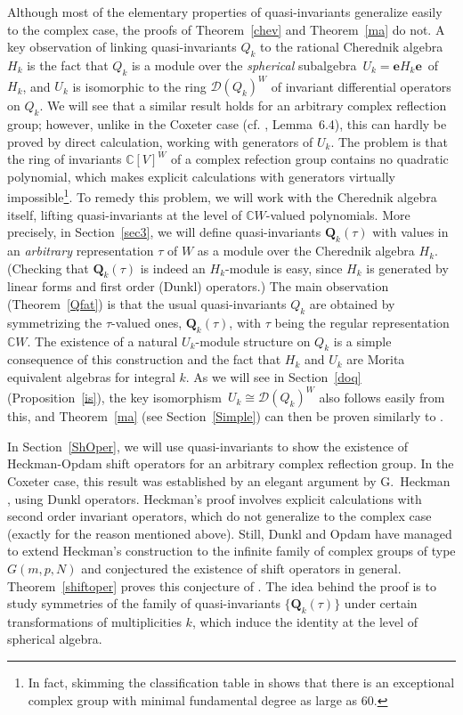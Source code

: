 \documentclass{amsart}
\theoremstyle{definition}
\theoremstyle{remark}
\numberwithin{equation}{section}
\begin{document}
Although most of the elementary properties of quasi-invariants generalize
easily to the complex case, the proofs of Theorem~\ref{chev} and Theorem~\ref{ma} do not.
A key observation of \cite{BEG} linking quasi-invariants $ Q_k $ to
the rational Cherednik algebra $ H_k $  is the fact
that $Q_k $ is a module over the {\it spherical} subalgebra $\, U_k = {\boldsymbol{e}} H_k {\boldsymbol{e}} \,$ of
$ H_k $, and $ U_k $ is isomorphic to the ring $ {\mathcal{D}}(Q_k)^W $ of invariant differential
operators on $Q_k $. We will see that a
similar result holds for an arbitrary complex reflection
group; however, unlike in the Coxeter case (cf. \cite{BEG}, Lemma~6.4), this can hardly
be proved by direct calculation, working with generators of $ U_k $. The problem is that the ring of invariants
$ {\mathbb{C}}[V]^W $ of a complex refection group contains no quadratic polynomial, which makes explicit calculations
with generators virtually impossible\footnote{In fact, skimming the
classification table in \cite{ST} shows that there is an exceptional complex group with minimal fundamental degree 
as large as $60$.}.
To remedy this problem, we will work with the Cherednik algebra itself, lifting quasi-invariants at the level
of ${\mathbb{C}} W$-valued polynomials. More precisely, in Section~\ref{sec3}, we will define quasi-invariants $ {\mathbf{Q}}_k(\tau) $
with values in an {\it arbitrary} representation $ \tau $ of $W$ as a module over the Cherednik algebra $H_k$.
(Checking that ${\mathbf{Q}}_k(\tau) $ is indeed an $H_k$-module is easy, since $ H_k $ is generated by linear forms
and first order (Dunkl) operators.) The main observation (Theorem~\ref{Qfat}) is that the usual quasi-invariants
$ Q_k $ are obtained by symmetrizing the $ \tau$-valued ones, $ {\mathbf{Q}}_k(\tau) $, with $ \tau $ being the regular
representation $ {\mathbb{C}} W$.
The existence of a natural $ U_k $-module structure on $ Q_k $ is a simple consequence of this construction and
the fact that $ H_k $ and $ U_k $ are Morita equivalent algebras for integral $k$. As we will see in
Section~\ref{doq} (Proposition~\ref{is}),
the key isomorphism $\, U_k \cong {\mathcal{D}}(Q_k)^W $ also follows easily from this, and Theorem~\ref{ma} (see Section~\ref{Simple})
can then be proven similarly to \cite{BEG}.

In Section~\ref{ShOper}, we will use quasi-invariants to show the existence of Heckman-Opdam shift
operators for an arbitrary complex reflection group. In the Coxeter case, this result was
established by an elegant argument by G.~Heckman \cite{H}, using Dunkl operators.
Heckman's proof involves explicit calculations with second order invariant operators,
which do not generalize to the complex case (exactly for the reason mentioned above). Still,
Dunkl and Opdam \cite{DO} have managed to extend Heckman's construction to the infinite family
of complex groups of type $ G(m,p,N) $ and conjectured the existence of shift operators in general.
Theorem~\ref{shiftoper} proves this conjecture of \cite{DO}. The idea behind
the proof is to study symmetries of the family of quasi-invariants $ \{ {\mathbf{Q}}_k(\tau) \} $ under certain
transformations of multiplicities $k$, which induce the identity at the level of spherical algebra.
\end{document}
